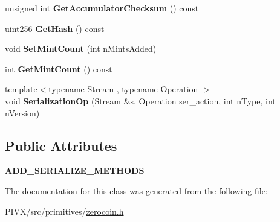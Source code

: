 \begin{DoxyCompactItemize}
\item 
\mbox{\label{class_c_zerocoin_spend_a8f09a6abe64248644b7358bf8f91256f}} 
unsigned int {\bfseries Get\+Accumulator\+Checksum} () const
\item 
\mbox{\label{class_c_zerocoin_spend_acb57c69c7c854a435c12b72251daeeb7}} 
\mbox{\hyperlink{classuint256}{uint256}} {\bfseries Get\+Hash} () const
\item 
\mbox{\label{class_c_zerocoin_spend_a29f5251de7d50fea055b945e1b8fa6a7}} 
void {\bfseries Set\+Mint\+Count} (int n\+Mints\+Added)
\item 
\mbox{\label{class_c_zerocoin_spend_a6ccd7e7c46538ae0097e46a53ddcc6cf}} 
int {\bfseries Get\+Mint\+Count} () const
\item 
\mbox{\label{class_c_zerocoin_spend_a71d0bc62d5b5b5160f14d7e8c875efa0}} 
{\footnotesize template$<$typename Stream , typename Operation $>$ }\\void {\bfseries Serialization\+Op} (Stream \&s, Operation ser\+\_\+action, int n\+Type, int n\+Version)
\end{DoxyCompactItemize}
\subsection*{Public Attributes}
\begin{DoxyCompactItemize}
\item 
\mbox{\label{class_c_zerocoin_spend_ac60ff339759847b91fd3065a41797bf7}} 
{\bfseries A\+D\+D\+\_\+\+S\+E\+R\+I\+A\+L\+I\+Z\+E\+\_\+\+M\+E\+T\+H\+O\+DS}
\end{DoxyCompactItemize}


The documentation for this class was generated from the following file\+:\begin{DoxyCompactItemize}
\item 
P\+I\+V\+X/src/primitives/\mbox{\hyperlink{zerocoin_8h}{zerocoin.\+h}}\end{DoxyCompactItemize}
